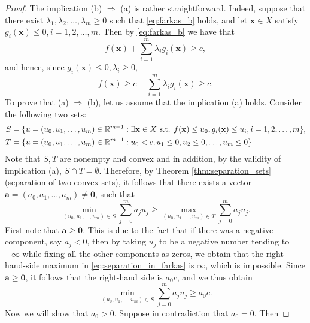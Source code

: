 \documentclass[10pt,a4paper]{article}
\begin{document}
\begin{proof}
	The implication (b) $\Rightarrow$ (a) is rather straightforward. Indeed, suppose that there exist
	$\lambda_1, \lambda_2, \ldots, \lambda_m \geq 0$ such that \eqref{eq:farkas_b} holds, and let $\mathbf{x} \in X$ satisfy $g_i(\mathbf{x}) \leq 0, i = 1, 2, \ldots, m$.
	Then by \eqref{eq:farkas_b} we have that
	\begin{equation*}
		f(\mathbf{x}) + \sum_{i=1}^{m} \lambda_i g_i(\mathbf{x}) \geq c,
	\end{equation*}
	and hence, since $g_i(\mathbf{x}) \leq 0, \lambda_i \geq 0$,
	\begin{equation*}
		f(\mathbf{x}) \geq c - \sum_{i=1}^{m} \lambda_i g_i(\mathbf{x}) \geq c.
	\end{equation*}
	\noindent To prove that (a) $\Rightarrow$ (b), let us assume that the implication (a) holds. Consider the following two sets:
	\begin{align*}
		S &= \{u = (u_0, u_1, \ldots, u_m)\in \mathbb{R}^{m+1} : \exists \mathbf{x} \in X \text{ s.t. } f(\mathbf{x}) \leq u_0, g_i(\mathbf{x}) \leq u_i, i = 1, 2, \ldots, m\}, \\
		T &= \{u=(u_0, u_1, \ldots, u_m) \in \mathbb{R}^{m+1} : u_0 < c, u_1\leq 0, u_2 \leq 0, \ldots, u_m \leq 0\}.
	\end{align*}
Note that $S, T$ are nonempty and convex and in addition, by the validity of implication
(a), $S \cap T = \emptyset$. Therefore, by Theorem \ref{thm:separation_sets} (separation of two convex sets), it follows
that there exists a vector $\mathbf{a} = (a_0, a_1, \ldots, a_m) \neq \mathbf{0}$, such that
\begin{equation}\label{eq:separation_in_farkas}
	\min_{(u_0, u_1, \ldots, u_m) \in S} \sum_{j=0}^{m} a_j u_j \geq \max_{(u_0, u_1, \ldots, u_m) \in T} \sum_{j=0}^{m} a_j u_j.
\end{equation}
First note that $\mathbf{a} \geq \mathbf{0}$. This is due to the fact that if there was a negative component, say $a_j < 0$, then by taking $u_j$ to be a negative number tending to $-\infty$ while fixing all the other
components as zeros, we obtain that the right-hand-side maximum in \eqref{eq:separation_in_farkas} is $\infty$, which
is impossible. Since $\mathbf{a} \geq \mathbf{0}$, it follows that the right-hand side is $a_0 c$, and we thus obtain
\begin{equation}\label{eq:separation_reworked_in_farkas}
	\min_{(u_0, u_1, \ldots, u_m) \in S} \sum_{j=0}^{m} a_j u_j \geq a_0 c.
\end{equation}
Now we will show that $a_0 > 0$. Suppose in contradiction that $a_0 = 0$. Then

\end{proof}
\end{document}
